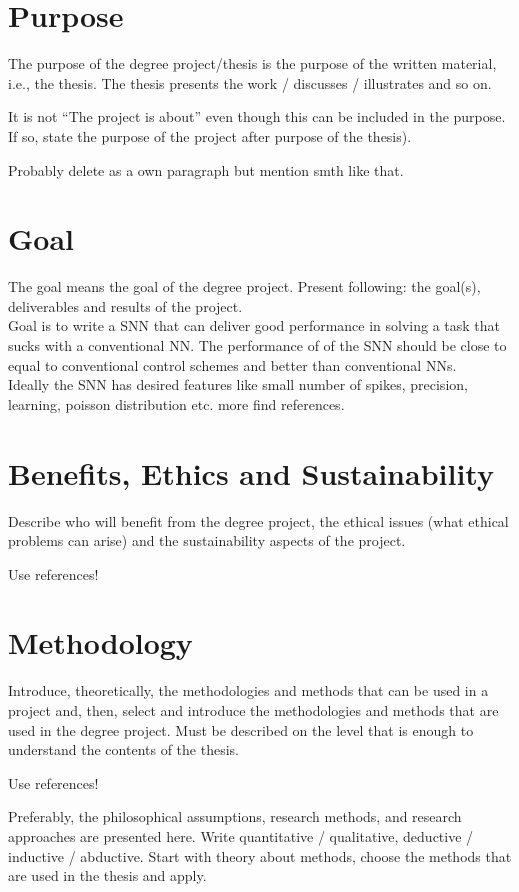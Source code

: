 \section{Purpose}
The purpose of the degree project/thesis is the purpose of the written material, i.e., the thesis. The thesis presents the work / discusses / illustrates and so on.

It is not “The project is about” even though this can be included in the purpose. If so, state the purpose of the project after purpose of the thesis).

Probably delete as a own paragraph but mention smth like that.

\section{Goal}
The goal means the goal of the degree project. Present following: the goal(s), deliverables and results of the project.\\
Goal is to write a SNN that can deliver good performance in solving a task that sucks with a conventional NN.
The performance of of the SNN should be close to equal to conventional control schemes and better than conventional NNs.\\
Ideally the SNN has desired features like small number of spikes, precision, learning, poisson distribution etc. more find references.
\section{Benefits, Ethics and Sustainability}
Describe who will benefit from the degree project, the ethical issues (what ethical problems can arise) and the sustainability aspects of the project.

Use references!

\section{Methodology}
Introduce, theoretically, the methodologies and methods that can be used in a project and, then, select and introduce the methodologies and methods that are used in the degree project. Must be described on the level that is enough to understand the contents of the thesis.

Use references!

Preferably, the philosophical assumptions, research methods, and research approaches are presented here. Write quantitative / qualitative, deductive / inductive / abductive. Start with theory about methods, choose the methods that are used in the thesis and apply.


